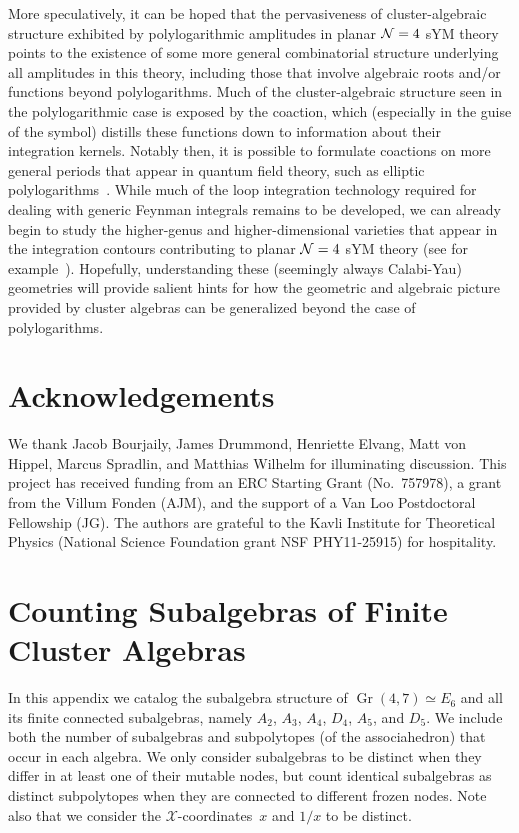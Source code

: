 \documentclass[12pt]{article}
\DeclareMathOperator{\Gr}{Gr}
\def\xcoords{$\mathcal{X}$-coordinates}
\begin{document}
More speculatively, it can be hoped that the pervasiveness of cluster-algebraic structure exhibited by polylogarithmic amplitudes in planar ${\cal N} = 4$ sYM theory points to the existence of some more general combinatorial structure underlying all amplitudes in this theory, including those that involve algebraic roots and/or functions beyond polylogarithms. Much of the cluster-algebraic structure seen in the polylogarithmic case is exposed by the coaction, which (especially in the guise of the symbol) distills these functions down to information about their integration kernels. Notably then, it is possible to formulate coactions on more general periods that appear in quantum field theory, such as elliptic polylogarithms~\cite{2015arXiv151206410B,Abreu:2017enx,Abreu:2017mtm,Broedel:2017kkb,Caron-Huot:2018dsv,Broedel:2018iwv}. While much of the loop integration technology required for dealing with generic Feynman integrals remains to be developed, we can already begin to study the higher-genus and higher-dimensional varieties that appear in the integration contours contributing to planar ${\cal N} = 4$ sYM theory (see for example~\cite{2009arXiv0910.0114B,Bourjaily:2017bsb,Bourjaily:2018ycu,Bourjaily:2018yfy}). Hopefully, understanding these (seemingly always Calabi-Yau) geometries will provide salient hints for how the geometric and algebraic picture provided by cluster algebras can be generalized beyond the case of polylogarithms.

\section*{Acknowledgements}

We thank Jacob Bourjaily, James Drummond, Henriette Elvang, Matt von Hippel, Marcus Spradlin, and Matthias Wilhelm for illuminating discussion. This project has received funding from an ERC Starting Grant \mbox{(No.\ 757978)}, a grant from the Villum Fonden (AJM), and the support of a Van Loo Postdoctoral Fellowship (JG). The authors are grateful to the Kavli Institute for Theoretical Physics (National Science Foundation grant NSF PHY11-25915) for hospitality. 


\appendix

\newpage

\section{Counting Subalgebras of Finite Cluster Algebras}\label{appendix:subalgebras}
In this appendix we catalog the subalgebra structure of $\Gr(4,7) \simeq E_6$ and all its finite connected subalgebras, namely $A_2$, $A_3$, $A_4$, $D_4$, $A_5$, and $D_5$. We include both the number of subalgebras and subpolytopes (of the associahedron) that occur in each algebra. We only consider subalgebras to be distinct when they differ in at least one of their mutable nodes, but count identical subalgebras as distinct subpolytopes when they are connected to different frozen nodes. Note also that we consider the \xcoords\ $x$ and $1/x$ to be distinct.
\end{document}
